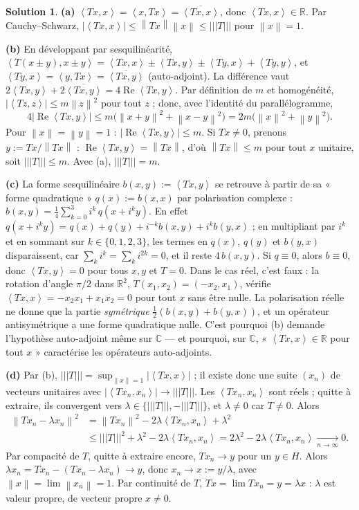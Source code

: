\documentclass[11pt,a4paper]{article}
\newcommand{\R}{\mathbb{R}}
\newcommand{\C}{\mathbb{C}}
\newcommand{\norm}[1]{\left\|#1\right\|}
\newcommand{\opnorm}[1]{|\!|\!|#1|\!|\!|}
\newcommand{\ps}[2]{\left\langle #1,#2\right\rangle}
\renewcommand{\Re}{\operatorname{Re}}
\theoremstyle{definition}
\newtheorem*{solution}{Solution}
\begin{document}
\begin{solution}
\noindent\textbf{(a)} $\ps{Tx}x=\ps x{Tx}=\overline{\ps{Tx}x}$, donc $\ps{Tx}x\in\R$. Par Cauchy--Schwarz, $|\ps{Tx}x|\le\norm{Tx}\norm x\le\opnorm T$ pour $\norm x=1$.

\medskip
\noindent\textbf{(b)} En développant par sesquilinéarité, $\ps{T(x\pm y)}{x\pm y}=\ps{Tx}x\pm\ps{Tx}y\pm\ps{Ty}x+\ps{Ty}y$, et $\ps{Ty}x=\ps y{Tx}=\overline{\ps{Tx}y}$ (auto-adjoint). La différence vaut $2\ps{Tx}y+2\overline{\ps{Tx}y}=4\Re\ps{Tx}y$. Par définition de $m$ et homogénéité, $|\ps{Tz}z|\le m\norm z^2$ pour tout $z$ ; donc, avec l'identité du parallélogramme,
\[
4|\Re\ps{Tx}y|\le m\big(\norm{x+y}^2+\norm{x-y}^2\big)=2m\big(\norm x^2+\norm y^2\big).
\]
Pour $\norm x=\norm y=1$ : $|\Re\ps{Tx}y|\le m$. Si $Tx\ne0$, prenons $y:=Tx/\norm{Tx}$ : $\Re\ps{Tx}y=\norm{Tx}$, d'où $\norm{Tx}\le m$ pour tout $x$ unitaire, soit $\opnorm T\le m$. Avec (a), $\opnorm T=m$.

\medskip
\noindent\textbf{(c)} La forme sesquilinéaire $b(x,y):=\ps{Tx}y$ se retrouve à partir de sa « forme quadratique » $q(x):=b(x,x)$ par polarisation complexe : $b(x,y)=\frac14\sum_{k=0}^3i^k\,q(x+i^ky)$. En effet $q(x+i^ky)=q(x)+q(y)+i^{-k}b(x,y)+i^kb(y,x)$ ; en multipliant par $i^k$ et en sommant sur $k\in\{0,1,2,3\}$, les termes en $q(x)$, $q(y)$ et $b(y,x)$ disparaissent, car $\sum_ki^k=\sum_ki^{2k}=0$, et il reste $4\,b(x,y)$. Si $q\equiv0$, alors $b\equiv0$, donc $\ps{Tx}y=0$ pour tous $x,y$ et $T=0$. Dans le cas réel, c'est faux : la rotation d'angle $\pi/2$ dans $\R^2$, $T(x_1,x_2)=(-x_2,x_1)$, vérifie $\ps{Tx}x=-x_2x_1+x_1x_2=0$ pour tout $x$ sans être nulle. La polarisation réelle ne donne que la partie \emph{symétrique} $\frac12(b(x,y)+b(y,x))$, et un opérateur antisymétrique a une forme quadratique nulle. C'est pourquoi (b) demande l'hypothèse auto-adjoint même sur $\C$ — et pourquoi, sur $\C$, « $\ps{Tx}x\in\R$ pour tout $x$ » caractérise les opérateurs auto-adjoints.

\medskip
\noindent\textbf{(d)} Par (b), $\opnorm T=\sup_{\norm x=1}|\ps{Tx}x|$ ; il existe donc une suite $(x_n)$ de vecteurs unitaires avec $|\ps{Tx_n}{x_n}|\to\opnorm T$. Les $\ps{Tx_n}{x_n}$ sont réels ; quitte à extraire, ils convergent vers $\lambda\in\{\opnorm T,-\opnorm T\}$, et $\lambda\ne0$ car $T\ne0$. Alors
\[
\begin{aligned}
\norm{Tx_n-\lambda x_n}^2&=\norm{Tx_n}^2-2\lambda\ps{Tx_n}{x_n}+\lambda^2\\
&\le\opnorm T^2+\lambda^2-2\lambda\ps{Tx_n}{x_n}=2\lambda^2-2\lambda\ps{Tx_n}{x_n}\xrightarrow[n\to\infty]{}0 .
\end{aligned}
\]
Par compacité de $T$, quitte à extraire encore, $Tx_n\to y$ pour un $y\in H$. Alors $\lambda x_n=Tx_n-(Tx_n-\lambda x_n)\to y$, donc $x_n\to x:=y/\lambda$, avec $\norm x=\lim\norm{x_n}=1$. Par continuité de $T$, $Tx=\lim Tx_n=y=\lambda x$ : $\lambda$ est valeur propre, de vecteur propre $x\ne0$.
\end{solution}
\end{document}
